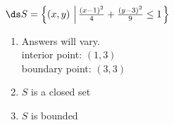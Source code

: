 {$\ds S = \left\{(x,y)\,\left| \, \frac{(x-1)^2}{4}+\frac{(y-3)^2}{9}\leq 1\right.\right\}$}
{\begin{enumerate}
\item Answers will vary.\\
interior point: $(1,3)$\\
boundary point: $(3,3)$\\
\item $S$ is a closed set\\
\item $S$ is bounded
\end{enumerate}
}